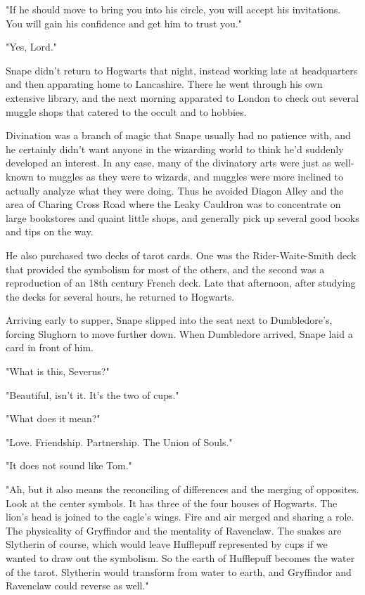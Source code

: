 "If he should move to bring you into his circle, you will accept his invitations. You will gain his confidence and get him to trust you."

"Yes, Lord."

Snape didn't return to Hogwarts that night, instead working late at headquarters and then apparating home to Lancashire. There he went through his own extensive library, and the next morning apparated to London to check out several muggle shops that catered to the occult and to hobbies.

Divination was a branch of magic that Snape usually had no patience with, and he certainly didn't want anyone in the wizarding world to think he'd suddenly developed an interest. In any case, many of the divinatory arts were just as well-known to muggles as they were to wizards, and muggles were more inclined to actually analyze what they were doing. Thus he avoided Diagon Alley and the area of Charing Cross Road where the Leaky Cauldron was to concentrate on large bookstores and quaint little shops, and generally pick up several good books and tips on the way.

He also purchased two decks of tarot cards. One was the Rider-Waite-Smith deck that provided the symbolism for most of the others, and the second was a reproduction of an 18th century French deck. Late that afternoon, after studying the decks for several hours, he returned to Hogwarts.

Arriving early to supper, Snape slipped into the seat next to Dumbledore's, forcing Slughorn to move further down. When Dumbledore arrived, Snape laid a card in front of him.

"What is this, Severus?"

"Beautiful, isn't it. It's the two of cups."

"What does it mean?"

"Love. Friendship. Partnership. The Union of Souls."

"It does not sound like Tom."

"Ah, but it also means the reconciling of differences and the merging of opposites. Look at the center symbols. It has three of the four houses of Hogwarts. The lion's head is joined to the eagle's wings. Fire and air merged and sharing a role. The physicality of Gryffindor and the mentality of Ravenclaw. The snakes are Slytherin of course, which would leave Hufflepuff represented by cups if we wanted to draw out the symbolism. So the earth of Hufflepuff becomes the water of the tarot. Slytherin would transform from water to earth, and Gryffindor and Ravenclaw could reverse as well."

